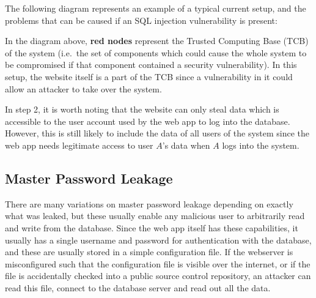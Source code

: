 \documentclass[12pt]{report}
\begin{document}
The following diagram represents an example of a typical current setup, and the problems that can be caused if an SQL injection vulnerability is present:

\begin{center}
\end{center}

In the diagram above, \textbf{red nodes} represent the Trusted Computing Base (TCB) of the system (i.e.\ the set of components which could cause the whole system to be compromised if that component contained a security vulnerability). In this setup, the website itself is a part of the TCB since a vulnerability in it could allow an attacker to take over the system.

In step 2, it is worth noting that the website can only steal data which is accessible to the user account used by the web app to log into the database. However, this is still likely to include the data of all users of the system since the web app needs legitimate access to user $A$'s data when $A$ logs into the system.

\subsection{Master Password Leakage}
There are many variations on master password leakage depending on exactly what was leaked, but these usually enable any malicious user to arbitrarily read and write from the database. Since the web app itself has these capabilities, it usually has a single username and password for authentication with the database, and these are usually stored in a simple configuration file. If the webserver is misconfigured such that the configuration file is visible over the internet, or if the file is accidentally checked into a public source control repository, an attacker can read this file, connect to the database server and read out all the data.
\end{document}
